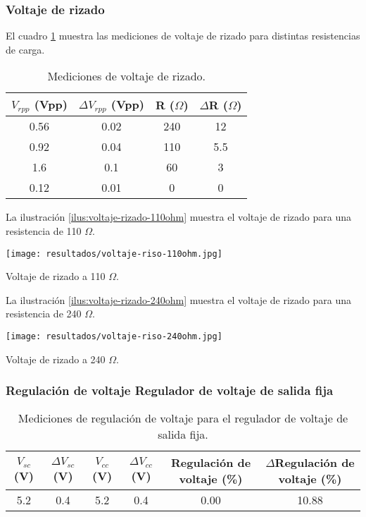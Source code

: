 \subsubsection{Voltaje de rizado}

El cuadro \ref{tab:mediciones-voltaje-rizado} muestra las mediciones de voltaje de rizado para distintas resistencias de carga.

\begin{table}[h!]
    \centering
    \begin{tabular}{|c|c|c|c|}
        \hline
        $V_{rpp}$ (Vpp) & $\Delta V_{rpp}$ (Vpp) & R ($\Omega$) & $\Delta$R ($\Omega$) \\
        \hline
        0.56 & 0.02 & 240 & 12 \\
        0.92 & 0.04 & 110 & 5.5 \\
        1.6 & 0.1 & 60 & 3 \\
        0.12 & 0.01 & 0 & 0 \\
        \hline
    \end{tabular}
    \caption{Mediciones de voltaje de rizado.}
    \label{tab:mediciones-voltaje-rizado}
\end{table}

La ilustración \ref{ilus:voltaje-rizado-110ohm} muestra el voltaje de rizado para una resistencia de 110 $\Omega$.

\begin{ilustracion}[ht]
    \centering
    \texttt{[image: resultados/voltaje-riso-110ohm.jpg]}
    \caption{Voltaje de rizado a 110 $\Omega$.}
    \label{ilus:voltaje-rizado-110ohm}
\end{ilustracion}

La ilustración \ref{ilus:voltaje-rizado-240ohm} muestra el voltaje de rizado para una resistencia de 240 $\Omega$.

\begin{ilustracion}[ht]
    \centering
    \texttt{[image: resultados/voltaje-riso-240ohm.jpg]}
    \caption{Voltaje de rizado a 240 $\Omega$.}
    \label{ilus:voltaje-rizado-240ohm}
\end{ilustracion}

\FloatBarrier
\subsubsection{Regulación de voltaje Regulador de voltaje de salida fija}

\begin{table}[h!]
    \centering
    \begin{tabular}{|c|c|c|c|c|c|}
        \hline
        $V_{sc}$ (V) & $\Delta V_{sc}$ (V) & $V_{cc}$ (V) & $\Delta V_{cc}$ (V) & Regulación de voltaje (\%) & $\Delta$Regulación de voltaje (\%) \\
        \hline
        5.2 & 0.4 & 5.2 & 0.4 & 0.00 & 10.88 \\
        \hline
    \end{tabular}
    \caption{Mediciones de regulación de voltaje para el regulador de voltaje de salida fija.}
    \label{tab:mediciones-regulacion-voltaje-fija}
\end{table}

